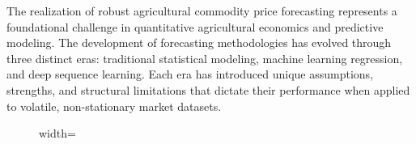 \documentclass[12pt,a4paper]{report}
\theoremstyle{definition}
\theoremstyle{remark}
\begin{document}
The realization of robust agricultural commodity price forecasting represents a foundational challenge in quantitative agricultural economics and predictive modeling. The development of forecasting methodologies has evolved through three distinct eras: traditional statistical modeling, machine learning regression, and deep sequence learning. Each era has introduced unique assumptions, strengths, and structural limitations that dictate their performance when applied to volatile, non-stationary market datasets.

\begin{figure}[htbp]
    \centering
    \begin{adjustbox}{width=\textwidth}
    \begin{minipage}{17cm}
        \centering
        
        
        \newcommand{\indhigh}{\tikz[baseline=-0.6ex]{\node[fill=black!75, rounded corners=2pt, inner sep=1.8pt, text=white, font=\tiny\bfseries\sffamily] {HIGH};}}
        \newcommand{\indmed}{\tikz[baseline=-0.6ex]{\node[draw=black!45, fill=black!4, rounded corners=2pt, inner sep=1.4pt, text=black!75, font=\tiny\bfseries\sffamily] {MEDIUM};}}
        \newcommand{\indlow}{\tikz[baseline=-0.6ex]{\node[draw=black!25, fill=white, rounded corners=2pt, inner sep=1.4pt, text=black!40, font=\tiny\bfseries\sffamily] {LOW};}}
        \newcommand{\indexpert}{\tikz[baseline=-0.6ex]{\node[fill=taxaccent, rounded corners=2pt, inner sep=1.8pt, text=white, font=\tiny\bfseries\sffamily] {✓ HIGH};}}
        

\end{minipage}
\end{adjustbox}
\end{figure}
\end{document}
